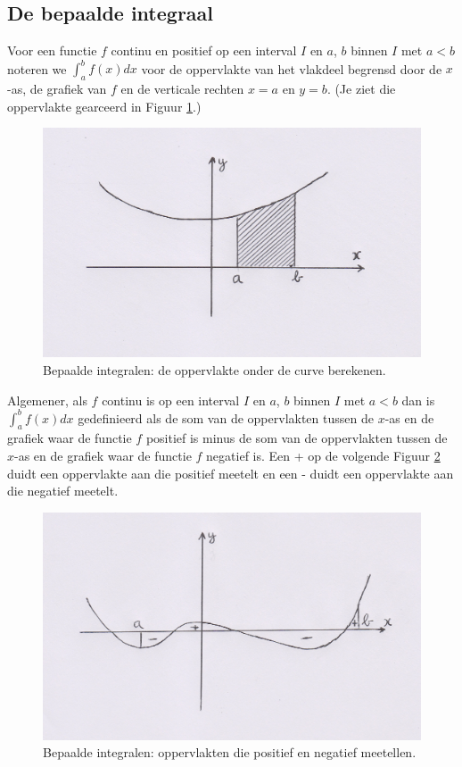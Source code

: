 \subsection{De bepaalde integraal}
Voor een functie $f$ continu en positief op een interval $I$ en $a$, $b$ binnen $I$ met $a<b$ noteren we $\int^b_a f(x)dx$ voor de oppervlakte van het vlakdeel begrensd door de $x$-as, de grafiek van $f$ en de verticale rechten $x=a$ en $y=b$.
(Je ziet die oppervlakte gearceerd in Figuur \ref{fig:int:1}.)

\begin{figure}[h]
	\begin{center}
		\includegraphics[width=.5\linewidth]{6_afgeleiden_integralen/inputs/integraal1.jpg}
		\caption{Bepaalde integralen: de oppervlakte onder de curve berekenen.}
		\label{fig:int:1}
	\end{center}
\end{figure}

\noindent Algemener, als $f$ continu is op een interval $I$ en $a$, $b$ binnen $I$ met $a<b$ dan is $\int ^b_a f(x)dx$ gedefinieerd als de som van de oppervlakten tussen de $x$-as en de grafiek waar de functie $f$ positief is minus de som van de oppervlakten tussen de $x$-as en de grafiek waar de functie $f$ negatief is.
Een + op de volgende Figuur \ref{fig:int:2} duidt een oppervlakte aan die positief meetelt en een - duidt een oppervlakte aan die negatief meetelt.\\

\begin{figure}[h]
	\begin{center}
		\includegraphics[height=5 cm]{6_afgeleiden_integralen/inputs/integraal2.JPG}
		\caption{Bepaalde integralen: oppervlakten die positief en negatief meetellen.}
		\label{fig:int:2}
	\end{center}
\end{figure}

